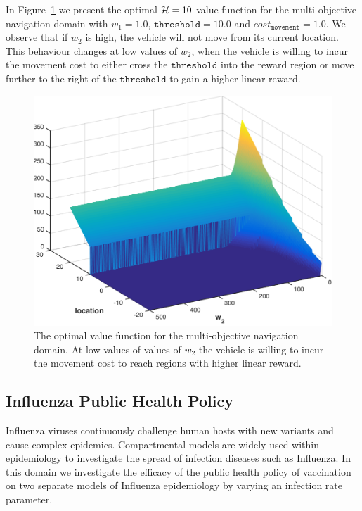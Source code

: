 In Figure~\ref{fig:vehicle1d} we present the optimal {\footnotesize$ \mathcal{H} = 10 $} value function for the multi-objective navigation domain with {\footnotesize $w_1 = 1.0$}, {\footnotesize $ \mathtt{threshold} = 10.0 $} and {\footnotesize$ cost_{\mathtt{movement}} = 1.0 $}. We observe that if {\footnotesize $ w_2 $} is high, the vehicle will not move from its current location. This behaviour changes at low values of {\footnotesize $ w_2 $}, when the vehicle is willing to incur the movement cost to either cross the {\footnotesize $ \mathtt{threshold} $} into the reward region or move further to the right of the {\footnotesize $ \mathtt{threshold} $} to gain a higher linear reward.
\begin{figure}[h!]
    \centering
    \includegraphics[width=0.8\linewidth, height=0.55\linewidth]{images/robot1d}
    \caption{The optimal value function for the multi-objective navigation domain. At low values of values of {\footnotesize $w_2$} the vehicle is willing to incur the movement cost to reach regions with higher linear reward.}
    \label{fig:vehicle1d}            
\end{figure}

\subsection{Influenza Public Health Policy}
\label{sec:results_influenza}

Influenza viruses continuously challenge human hosts with new variants and cause complex epidemics. Compartmental models are widely used within epidemiology to investigate the spread of infection diseases such as Influenza. In this domain we investigate the efficacy of the public health policy of vaccination on two separate models of Influenza epidemiology by varying an infection rate parameter.

